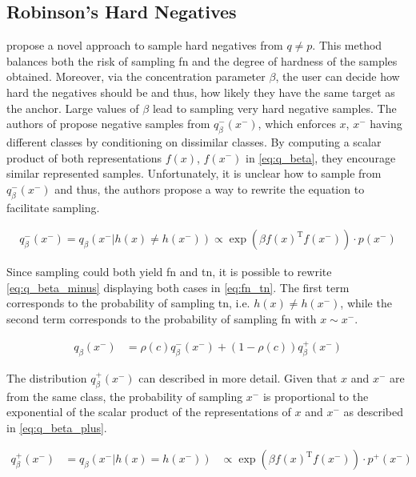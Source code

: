 \subsection{Robinson's Hard Negatives}\label{subsec:robinson_hard_negatives}


\citet{robinson_contrastive_2021} 
propose a novel approach to sample hard negatives from $q \neq p$.
This method balances both the risk of sampling \ac{fn} and the degree of hardness of the samples obtained.
Moreover, via the concentration parameter $\beta$, the user can decide how hard the negatives should be and thus, how likely they have the same target as the anchor.
Large values of $\beta$ lead to sampling very hard negative samples.
The authors of \citet{robinson_contrastive_2021} propose negative samples from $q^-_{\beta}(x^-)$, 
which enforces $x$, $x^-$ having different classes by conditioning on dissimilar classes.
By computing a scalar product of both representations $f(x)$, $f(x^-)$ in \eqref{eq:q_beta}, 
they encourage similar represented samples.
Unfortunately, it is unclear how to sample from $q^-_{\beta}(x^-)$ and thus, 
the authors propose a way to rewrite the equation to facilitate sampling.

\begin{align} 
    q^-_{\beta}(x^-) = q_\beta(x^-|h(x) \neq h(x^-)) \propto \exp(\beta f(x)^\text{T}f(x^-))\cdot p(x^-) 
\label{eq:q_beta}
\end{align} 


Since sampling could both yield \ac{fn} and \ac{tn}, it is possible to rewrite \eqref{eq:q_beta_minus} 
displaying both cases in \eqref{eq:fn_tn}.
The first term corresponds to the probability of sampling \ac{tn}, i.e. $h(x) \neq h(x^-)$,
 while the second term corresponds to the probability of sampling \ac{fn} with $x \sim x^-$.

\begin{align}
    q_\beta(x^-) &= \rho(c)q^{-}_\beta(x^-) + (1-\rho(c))q^{+}_\beta(x^-)
    \label{eq:fn_tn}
\end{align}

The distribution $q^{+}_\beta(x^-)$ can described in more detail.
Given that $x$ and $x^-$ are from the same class, 
the probability of sampling $x^-$ is proportional to the exponential of the scalar product of the 
representations of $x$ and $x^-$ as described in \eqref{eq:q_beta_plus}.

\begin{align}
    q^{+}_\beta(x^-) &= q_\beta(x^-|h(x) = h(x^-)) &\propto \exp(\beta f(x)^\text{T}f(x^-))\cdot p^+(x^-) 
    \label{eq:q_beta_plus}
\end{align}

